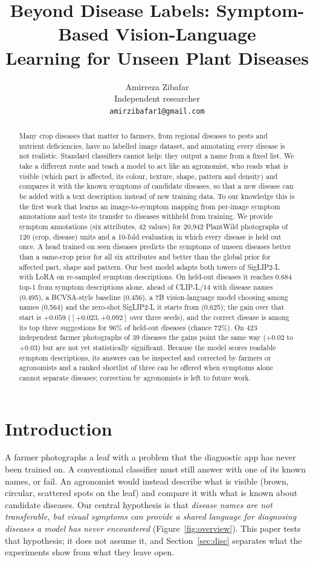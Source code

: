 \documentclass[11pt]{article}
\title{Beyond Disease Labels: Symptom-Based Vision-Language\\ Learning for Unseen Plant Diseases}
\author{Amirreza Zibafar \\ \small{Independent researcher} \\ \small{\texttt{amirzibafar1@gmail.com}}}
\date{}
\begin{document}
\maketitle

\begin{abstract}
Many crop diseases that matter to farmers, from regional diseases to pests and nutrient deficiencies, have no labelled image dataset, and annotating every disease is not realistic. Standard classifiers cannot help: they output a name from a fixed list. We take a different route and teach a model to act like an agronomist, who reads what is visible (which part is affected, its colour, texture, shape, pattern and density) and compares it with the known symptoms of candidate diseases, so that a new disease can be added with a text description instead of new training data. To our knowledge this is the first work that learns an image-to-symptom mapping from per-image symptom annotations and tests its transfer to diseases withheld from training. We provide symptom annotations (six attributes, 42 values) for 20{,}942 PlantWild photographs of 120 (crop, disease) units and a 10-fold evaluation in which every disease is held out once. A head trained on seen diseases predicts the symptoms of unseen diseases better than a same-crop prior for all six attributes and better than the global prior for affected part, shape and pattern. Our best model adapts both towers of SigLIP2-L with LoRA on re-sampled symptom descriptions. On held-out diseases it reaches 0.684 top-1 from symptom descriptions alone, ahead of CLIP-L/14 with disease names (0.495), a BCVSA-style baseline (0.456), a 7B vision-language model choosing among names (0.564) and the zero-shot SigLIP2-L it starts from (0.625); the gain over that start is $+0.059$ ($[+0.023, +0.092]$ over three seeds), and the correct disease is among its top three suggestions for 96\% of held-out diseases (chance 72\%). On 423 independent farmer photographs of 39 diseases the gains point the same way ($+0.02$ to $+0.03$) but are not yet statistically significant. Because the model scores readable symptom descriptions, its answers can be inspected and corrected by farmers or agronomists and a ranked shortlist of three can be offered when symptoms alone cannot separate diseases; correction by agronomists is left to future work.
\end{abstract}

\section{Introduction}
A farmer photographs a leaf with a problem that the diagnostic app has never been trained on. A conventional classifier must still answer with one of its known names, or fail. An agronomist would instead describe what is visible (brown, circular, scattered spots on the leaf) and compare it with what is known about candidate diseases. Our central hypothesis is that \emph{disease names are not transferable, but visual symptoms can provide a shared language for diagnosing diseases a model has never encountered} (Figure~\ref{fig:overview}). This paper tests that hypothesis; it does not assume it, and Section~\ref{sec:disc} separates what the experiments show from what they leave open.
\end{document}

